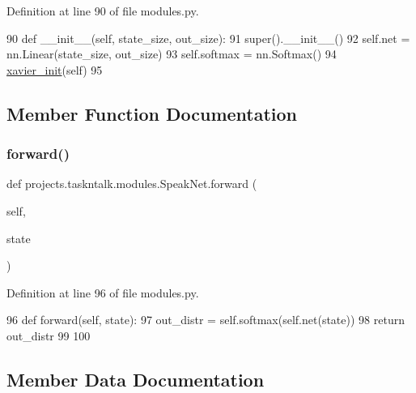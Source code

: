 Definition at line 90 of file modules.\+py.


\begin{DoxyCode}
90     \textcolor{keyword}{def }\_\_init\_\_(self, state\_size, out\_size):
91         super().\_\_init\_\_()
92         self.net = nn.Linear(state\_size, out\_size)
93         self.softmax = nn.Softmax()
94         \hyperlink{namespaceprojects_1_1taskntalk_1_1modules_a483197f0d561a3d1ef7d04a2de70e571}{xavier\_init}(self)
95 
\end{DoxyCode}


\subsection{Member Function Documentation}
\mbox{\label{classprojects_1_1taskntalk_1_1modules_1_1SpeakNet_a021aca62f72ae7f3fd7787c76883866e}} 
\subsubsection{\texorpdfstring{forward()}{forward()}}
{\footnotesize\ttfamily def projects.\+taskntalk.\+modules.\+Speak\+Net.\+forward (\begin{DoxyParamCaption}\item[{}]{self,  }\item[{}]{state }\end{DoxyParamCaption})}



Definition at line 96 of file modules.\+py.


\begin{DoxyCode}
96     \textcolor{keyword}{def }forward(self, state):
97         out\_distr = self.softmax(self.net(state))
98         \textcolor{keywordflow}{return} out\_distr
99 
100 
\end{DoxyCode}


\subsection{Member Data Documentation}
\mbox{\label{classprojects_1_1taskntalk_1_1modules_1_1SpeakNet_ad9777e1aceeb36bedb44e5bcbf9cf7c3}} 

